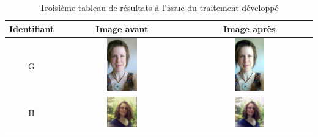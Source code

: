 \documentclass[11pt, french]{report-rd-info}
\begin{document}
\begin{table}
\centering
\begin{tabular}{|c|c|c|}	
   \hline \textbf{Identifiant}  &  \textbf{Image avant}  &  \textbf{Image après} \\ \hline 
   G & \includegraphics[width=0.25\textwidth]{Resultats/pg_avant} & \includegraphics[width=0.25\textwidth]{Resultats/pg_apres} \\ \hline
   H & \includegraphics[width=0.25\textwidth]{Resultats/ph_avant} & \includegraphics[width=0.25\textwidth]{Resultats/ph_apres} \\ \hline   
\end{tabular}
\caption{Troisième tableau de résultats à l'issue du traitement développé}
\label{tab:Resultats3}
\end{table}
\end{document}
